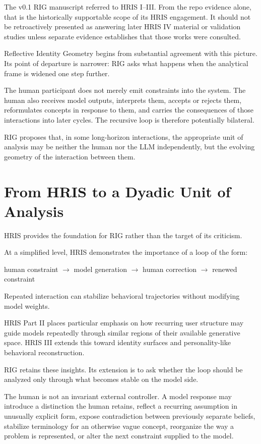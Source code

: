 \documentclass[12pt]{article}
\begin{document}
The v0.1 RIG manuscript referred to HRIS I--III. From the repo evidence alone, that is the historically supportable scope of its HRIS engagement. It should not be retroactively presented as answering later HRIS IV material or validation studies unless separate evidence establishes that those works were consulted.

Reflective Identity Geometry begins from substantial agreement with this picture. Its point of departure is narrower: RIG asks what happens when the analytical frame is widened one step further.

The human participant does not merely emit constraints into the system. The human also receives model outputs, interprets them, accepts or rejects them, reformulates concepts in response to them, and carries the consequences of those interactions into later cycles. The recursive loop is therefore potentially bilateral.

RIG proposes that, in some long-horizon interactions, the appropriate unit of analysis may be neither the human nor the LLM independently, but the evolving geometry of the interaction between them.

\section{From HRIS to a Dyadic Unit of Analysis}

HRIS provides the foundation for RIG rather than the target of its criticism.

At a simplified level, HRIS demonstrates the importance of a loop of the form:

\begin{center}
human constraint $\rightarrow$ model generation $\rightarrow$ human correction $\rightarrow$ renewed constraint
\end{center}

Repeated interaction can stabilize behavioral trajectories without modifying model weights.

HRIS Part II places particular emphasis on how recurring user structure may guide models repeatedly through similar regions of their available generative space. HRIS III extends this toward identity surfaces and personality-like behavioral reconstruction.

RIG retains these insights. Its extension is to ask whether the loop should be analyzed only through what becomes stable on the model side.

The human is not an invariant external controller. A model response may introduce a distinction the human retains, reflect a recurring assumption in unusually explicit form, expose contradiction between previously separate beliefs, stabilize terminology for an otherwise vague concept, reorganize the way a problem is represented, or alter the next constraint supplied to the model.
\end{document}
